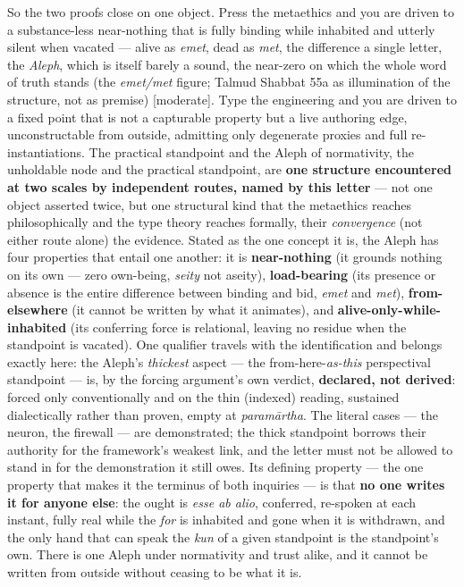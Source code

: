 \documentclass[11pt]{article}
\begin{document}
So the two proofs close on one object. Press the metaethics and you are driven to a substance-less near-nothing that is fully binding while inhabited and utterly silent when vacated — alive as \emph{emet}, dead as \emph{met}, the difference a single letter, the \emph{Aleph}, which is itself barely a sound, the near-zero on which the whole word of truth stands (the \emph{emet/\allowbreak{}met} figure; Talmud Shabbat 55a as illumination of the structure, not as premise) [moderate]. Type the engineering and you are driven to a fixed point that is not a capturable property but a live authoring edge, unconstructable from outside, admitting only degenerate proxies and full re-instantiations. The practical standpoint and the Aleph of normativity, the unholdable node and the practical standpoint, are \textbf{one structure encountered at two scales by independent routes, named by this letter} — not one object asserted twice, but one structural kind that the metaethics reaches philosophically and the type theory reaches formally, their \emph{convergence} (not either route alone) the evidence. Stated as the one concept it is, the Aleph has four properties that entail one another: it is \textbf{near-nothing} (it grounds nothing on its own — zero own-being, \emph{seity} not aseity), \textbf{load-bearing} (its presence or absence is the entire difference between binding and bid, \emph{emet} and \emph{met}), \textbf{from-elsewhere} (it cannot be written by what it animates), and \textbf{alive-only-while-inhabited} (its conferring force is relational, leaving no residue when the standpoint is vacated). One qualifier travels with the identification and belongs exactly here: the Aleph's \emph{thickest} aspect — the from-here-\emph{as-this} perspectival standpoint — is, by the forcing argument's own verdict, \textbf{declared, not derived}: forced only conventionally and on the thin (indexed) reading, sustained dialectically rather than proven, empty at \emph{paramārtha}. The literal cases — the neuron, the firewall — are demonstrated; the thick standpoint borrows their authority for the framework's weakest link, and the letter must not be allowed to stand in for the demonstration it still owes. Its defining property — the one property that makes it the terminus of both inquiries — is that \textbf{no one writes it for anyone else}: the ought is \emph{esse ab alio}, conferred, re-spoken at each instant, fully real while the \emph{for} is inhabited and gone when it is withdrawn, and the only hand that can speak the \emph{kun} of a given standpoint is the standpoint's own. There is one Aleph under normativity and trust alike, and it cannot be written from outside without ceasing to be what it is.
\end{document}
